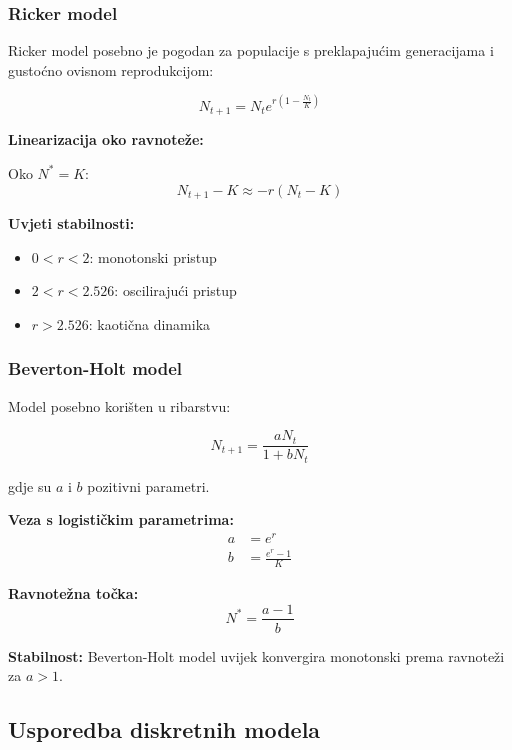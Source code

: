 \documentclass[11pt,oneside]{book}
\begin{document}
\subsubsection{Ricker model}

Ricker model posebno je pogodan za populacije s preklapajućim generacijama i gustoćno ovisnom reprodukcijom:

\begin{equation}
	N_{t+1} = N_t e^{r\left(1 - \frac{N_t}{K}\right)}
\end{equation}

\textbf{Linearizacija oko ravnoteže:}

Oko $N^* = K$:
\begin{equation}
	N_{t+1} - K \approx -r(N_t - K)
\end{equation}

\textbf{Uvjeti stabilnosti:}
\begin{itemize}
	\item $0 < r < 2$: monotonski pristup
	\item $2 < r < 2.526$: oscilirajući pristup
	\item $r > 2.526$: kaotična dinamika
\end{itemize}

\subsubsection{Beverton-Holt model}

Model posebno korišten u ribarstvu:

\begin{equation}
	N_{t+1} = \frac{aN_t}{1 + bN_t}
\end{equation}

gdje su $a$ i $b$ pozitivni parametri.

\textbf{Veza s logističkim parametrima:}
\begin{align}
	a &= e^r \\
	b &= \frac{e^r - 1}{K}
\end{align}

\textbf{Ravnotežna točka:}
\begin{equation}
	N^* = \frac{a-1}{b}
\end{equation}

\textbf{Stabilnost:} Beverton-Holt model uvijek konvergira monotonski prema ravnoteži za $a > 1$.

\subsection{Usporedba diskretnih modela}
\end{document}
